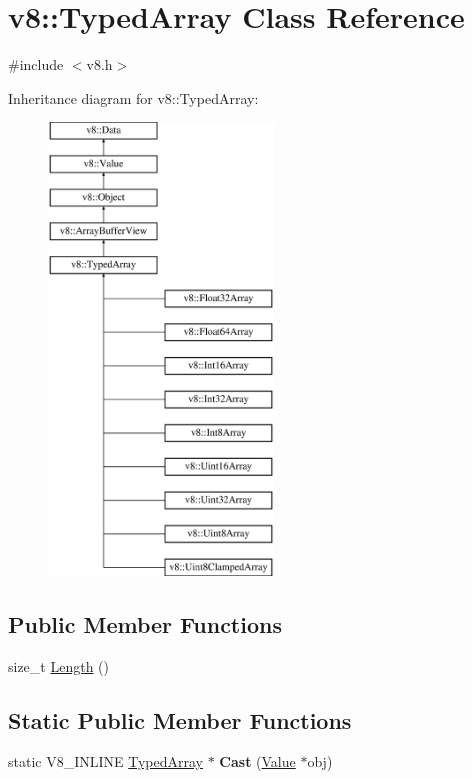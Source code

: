 \hypertarget{classv8_1_1_typed_array}{}\section{v8\+:\+:Typed\+Array Class Reference}
\label{classv8_1_1_typed_array}


{\ttfamily \#include $<$v8.\+h$>$}

Inheritance diagram for v8\+:\+:Typed\+Array\+:\begin{figure}[H]
\begin{center}
\leavevmode
\includegraphics[height=12.000000cm]{classv8_1_1_typed_array}
\end{center}
\end{figure}
\subsection*{Public Member Functions}
\begin{DoxyCompactItemize}
\item 
size\+\_\+t \hyperlink{classv8_1_1_typed_array_abb1047225d53d960c0da9c9f83cd7042}{Length} ()
\end{DoxyCompactItemize}
\subsection*{Static Public Member Functions}
\begin{DoxyCompactItemize}
\item 
\hypertarget{classv8_1_1_typed_array_ac3f23cc8171d3be0815df7731140382f}{}static V8\+\_\+\+I\+N\+L\+I\+N\+E \hyperlink{classv8_1_1_typed_array}{Typed\+Array} $\ast$ {\bfseries Cast} (\hyperlink{classv8_1_1_value}{Value} $\ast$obj)\label{classv8_1_1_typed_array_ac3f23cc8171d3be0815df7731140382f}

\end{DoxyCompactItemize}
